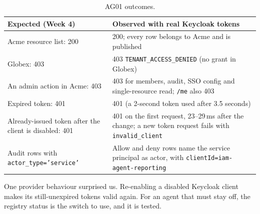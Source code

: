 \documentclass{article}
\begin{document}
\begin{table}[H]
\centering
\begin{tabularx}{\textwidth}{@{}Y Y@{}}
\toprule
\textbf{Expected (Week 4)} & \textbf{Observed with real Keycloak tokens} \\
\midrule
Acme resource list: 200 & 200; every row belongs to Acme and is published \\
Globex: 403 & 403 \texttt{TENANT\_ACCESS\_DENIED} (no grant in Globex) \\
An admin action in Acme: 403 & 403 for members, audit, SSO config and single-resource read; \texttt{/me} also 403 \\
Expired token: 401 & 401 (a 2-second token used after 3.5 seconds) \\
Already-issued token after the client is disabled: 401 & 401 on the first request, 23--29\,ms after the change; a new token request fails with \texttt{invalid\_client} \\
Audit rows with \texttt{actor\_type='service'} & Allow and deny rows name the service principal as actor, with \texttt{clientId=iam-agent-reporting} \\
\bottomrule
\end{tabularx}
\caption{AG01 outcomes.}
\end{table}

One provider behaviour surprised us. Re-enabling a disabled Keycloak client makes its still-unexpired tokens valid again. For an agent that must stay off, the registry status is the switch to use, and it is tested.
\end{document}
